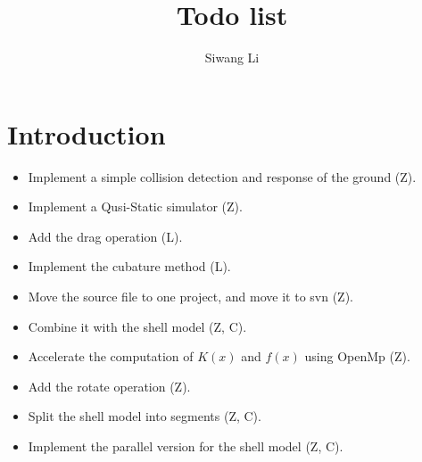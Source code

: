 \documentclass[9pt,twocolumn]{extarticle}
\author{Siwang Li}
\title{Todo list}
\begin{document}
\maketitle

\setlength{\parskip}{0.5ex}

\section{Introduction}
\begin{itemize}
    
\item Implement a simple collision detection and response of the ground (Z).

\item Implement a Qusi-Static simulator (Z).

\item Add the drag operation (L).

\item Implement the cubature method (L).

\item Move the source file to one project, and move it to svn (Z).

\item Combine it with the shell model (Z, C).

\item Accelerate the computation of $K(x)$ and $f(x)$ using OpenMp (Z).

\item Add the rotate operation (Z).

\item Split the shell model into segments (Z, C).

\item Implement the parallel version for the shell model (Z, C).
  
\end{itemize}


\end{document}
